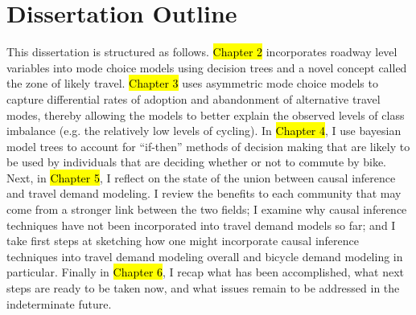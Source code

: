 \documentclass{article}
\begin{document}
\section{Dissertation Outline}
\label{sec:dissertation-outline}
This dissertation is structured as follows. \hl{Chapter 2} incorporates roadway level variables into mode choice models using decision trees and a novel concept called the zone of likely travel. \hl{Chapter 3} uses asymmetric mode choice models to capture differential rates of adoption and abandonment of alternative travel modes, thereby allowing the models to better explain the observed levels of class imbalance (e.g. the relatively low levels of cycling). In \hl{Chapter 4}, I use bayesian model trees to account for ``if-then'' methods of decision making that are likely to be used by individuals that are deciding whether or not to commute by bike. Next, in \hl{Chapter 5}, I reflect on the state of the union between causal inference and travel demand modeling. I review the benefits to each community that may come from a stronger link between the two fields; I examine why causal inference techniques have not been incorporated into travel demand models so far; and I take first steps at sketching how one might incorporate causal inference techniques into travel demand modeling overall and bicycle demand modeling in particular. Finally in \hl{Chapter 6}, I recap what has been accomplished, what next steps are ready to be taken now, and what issues remain to be addressed in the indeterminate future.

\newpage

\end{document}
